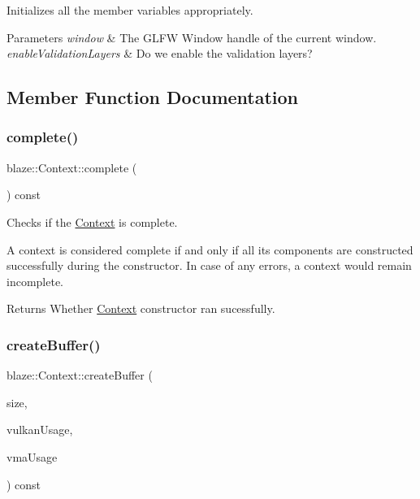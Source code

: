 Initializes all the member variables appropriately. 


\begin{DoxyParams}{Parameters}
{\em window} & The G\+L\+FW Window handle of the current window. \\
\hline
{\em enable\+Validation\+Layers} & Do we enable the validation layers? \\
\hline
\end{DoxyParams}


\subsection{Member Function Documentation}
\mbox{\label{classblaze_1_1Context_a781b839debbaa0c0ffffa3328dc1d9bd}} 
\subsubsection{\texorpdfstring{complete()}{complete()}}
{\footnotesize\ttfamily blaze\+::\+Context\+::complete (\begin{DoxyParamCaption}{ }\end{DoxyParamCaption}) const\hspace{0.3cm}{\ttfamily [inline]}}



Checks if the \hyperlink{classblaze_1_1Context}{Context} is complete. 

A context is considered complete if and only if all its components are constructed successfully during the constructor. In case of any errors, a context would remain incomplete.

\begin{DoxyReturn}{Returns}
Whether \hyperlink{classblaze_1_1Context}{Context} constructor ran sucessfully. 
\end{DoxyReturn}
\mbox{\label{classblaze_1_1Context_ae3d500fa6b216cd92a2b589360bc460f}} 
\subsubsection{\texorpdfstring{create\+Buffer()}{createBuffer()}}
{\footnotesize\ttfamily blaze\+::\+Context\+::create\+Buffer (\begin{DoxyParamCaption}\item[{size\+\_\+t}]{size,  }\item[{Vk\+Buffer\+Usage\+Flags}]{vulkan\+Usage,  }\item[{Vma\+Memory\+Usage}]{vma\+Usage }\end{DoxyParamCaption}) const}



